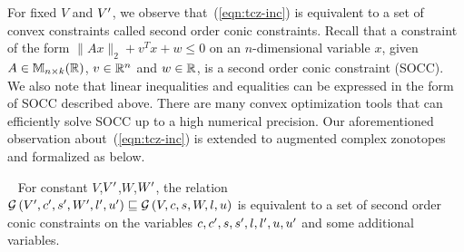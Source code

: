 For fixed $V$ and $V^\prime$, we observe that~(\ref{eqn:tcz-inc}) is
equivalent to a set of convex constraints called second order
conic constraints.
%
Recall that a constraint of the form $\|Ax\|_{2}+v^Tx+w\leq 0$ on an $n$-dimensional
variable $x$, given $A\in\mathbb{M}_{n\times k}(\mathbb{\mathbb{R}})$, $v\in\mathbb{R}^n$ and $w\in\mathbb{R}$, is
a second order conic constraint (SOCC).
%
We also note that linear inequalities and equalities can be expressed
in the form of SOCC described above. There are many convex optimization tools that can efficiently solve
SOCC up to a high numerical precision. Our aforementioned observation
about~(\ref{eqn:tcz-inc}) is extended to augmented
complex zonotopes and formalized as below.
%
\begin{proposition}~\label{lem:zon-socc}
For constant $V$,$V^\prime$,$W$,$W^\prime$, the relation\\
$\mathcal{G}\left(V^\prime,c^\prime,s^\prime,W^\prime,l^\prime,u^\prime\right)\sqsubseteq \mathcal{G}\left(V,c,s,W,l,u\right)$ is equivalent to a set of second order conic constraints on
the variables $c,c^\prime,s,s^\prime,l,l^\prime,u,u^\prime$ and some additional
variables.
\end{proposition}
%













